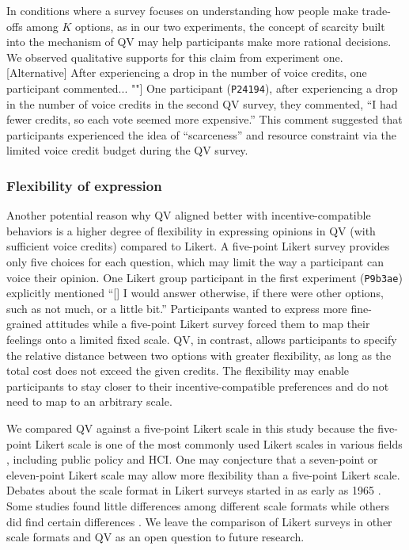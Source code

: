In conditions where a survey focuses on understanding how people make trade-offs among $K$ options, as in our two experiments, the concept of scarcity built into the mechanism of QV may help participants make more rational decisions. We observed qualitative supports for this claim from experiment one. [Alternative] After experiencing a drop in the number of voice credits, one participant commented... ""] One participant (\texttt{P24194}), after experiencing a drop in the number of voice credits in the second QV survey, they commented, ``I had fewer credits, so each vote seemed more expensive.'' This comment suggested that participants experienced the idea of ``scarceness'' and resource constraint via the limited voice credit budget during the QV survey.

\subsubsection{Flexibility of expression}
Another potential reason why QV aligned better with incentive-compatible behaviors is a higher degree of flexibility in expressing opinions in QV (with sufficient voice credits) compared to Likert. A five-point Likert survey provides only five choices for each question, which may limit the way a participant can voice their opinion. One Likert group participant in the first experiment (\texttt{P9b3ae}) explicitly mentioned ``[\textellipsis] I would answer otherwise, if there were other options, such as not much, or a little bit.'' Participants wanted to express more fine-grained attitudes while a five-point Likert survey forced them to map their feelings onto a limited fixed scale. QV, in contrast, allows participants to specify the relative distance between two options with greater flexibility, as long as the total cost does not exceed the given credits. The flexibility may enable participants to stay closer to their incentive-compatible preferences and do not need to map to an arbitrary scale.

We compared QV against a five-point Likert scale in this study because the five-point Likert scale is one of the most commonly used Likert scales in various fields \cite{malhotra2006basic}, including public policy and HCI. One may conjecture that a seven-point or eleven-point Likert scale may allow more flexibility than a five-point Likert scale. Debates about the scale format in Likert surveys started in as early as 1965 \cite{komorita1965number}. Some studies found little differences among different scale formats while others did find certain differences \cite{dawes2008data}. We leave the comparison of Likert surveys in other scale formats and QV as an open question to future research.

